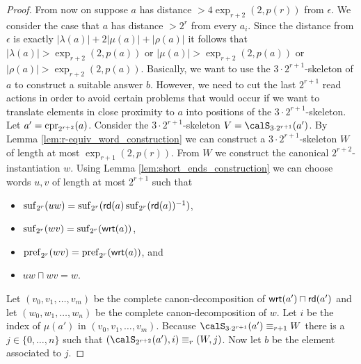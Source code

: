 \begin{proof}
	From now on suppose $a$ has  distance $> 4\exp_{r+2}(2, p(r))$ from $\epsilon$.	
	We consider the case that $a$ has distance $>2^r$ from every $a_i$.
	Since the distance from $\epsilon$ is exactly $|\lambda(a)| + 2|\mu(a)| + |\rho(a)|$ it follows that $|\lambda(a)| > \exp_{r+2}(2,p(a))$ or $|\mu({a})| > \exp_{r+2}(2,p(a))$ or $|\rho(a)| > \exp_{r+2}(2,p(a))$. 
	Basically, we want to use the $3\cdot 2^{r+1}$-skeleton of $a$ to construct a suitable answer $b$. However, we need to cut the last $2^{r+1}$ read actions in order to avoid certain problems that would occur if we want to translate elements in close proximity to $a$ into positions of the $3\cdot 2^{r+1}$-skeleton.   
	Let $a'= \operatorname{cpr}_{2^{r+2}}(a)$.  Consider 
	the $3\cdot 2^{r+1}$-skeleton $V = \calS_{3\cdot 2^{r+1}}(a')$. By Lemma \ref{lem:r-equiv_word_construction} we can construct a $3\cdot 2^{r+1}$-skeleton $W$ of length at most $\exp_{r+1}(2,p(r))$. From $W$ we construct the canonical $2^{r+2}$-instantiation $w$. Using Lemma \ref{lem:short_ends_construction} we can choose words $u,v$ of length at most 
	$2^{r+1}$ such that 
	\begin{itemize}
		\item $\operatorname{suf}_{2^{r}}(uw) = \operatorname{suf}_{2^{r}}(\mathsf{rd}(a)\operatorname{suf}_{2^{r}}(\mathsf{rd}(a))^{-1} )$,
		\item $\operatorname{suf}_{2^{r}}(wv) = \operatorname{suf}_{2^{r}}(\mathsf{wrt}(a))$,
		\item $\operatorname{pref}_{2^{r}}(wv) = \operatorname{pref}_{2^{r}}(\mathsf{wrt}(a))$, and
		\item $uw\sqcap wv = w$.
	\end{itemize}
	Let $(v_0,v_1,\ldots, v_m)$ be the complete canon-decomposition of $\mathsf{wrt}(a')\sqcap \mathsf{rd}(a')$ and let $(w_0, w_1,\ldots, w_n)$ be the complete canon-decomposition of $w$. Let $i$
	be the index of $\mu(a')$ in $(v_0,v_1,\ldots, v_m)$. Because $\calS_{3\cdot 2^{r+1}}(a') \equiv_{r+1} W$ there is a $j\in \{0,\ldots,n\}$ such that $(\calS_{2^{r+2}}(a'), i) \equiv_r (W,j)$.
	Now let $b$ be the element associated to $j$.
	

\end{proof}
